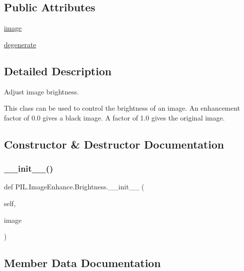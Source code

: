 \subsection*{Public Attributes}
\begin{DoxyCompactItemize}
\item 
\hyperlink{classPIL_1_1ImageEnhance_1_1Brightness_a23f1bdddf742e3eba6c540b351372340}{image}
\item 
\hyperlink{classPIL_1_1ImageEnhance_1_1Brightness_a91d86f1455b0419f8373255adbe1b0be}{degenerate}
\end{DoxyCompactItemize}


\subsection{Detailed Description}
\begin{DoxyVerb}Adjust image brightness.

This class can be used to control the brightness of an image.  An
enhancement factor of 0.0 gives a black image. A factor of 1.0 gives the
original image.
\end{DoxyVerb}
 

\subsection{Constructor \& Destructor Documentation}
\mbox{\label{classPIL_1_1ImageEnhance_1_1Brightness_a1dfdde5a038298050c7d76601a60d5d3}} 
\subsubsection{\texorpdfstring{\+\_\+\+\_\+init\+\_\+\+\_\+()}{\_\_init\_\_()}}
{\footnotesize\ttfamily def P\+I\+L.\+Image\+Enhance.\+Brightness.\+\_\+\+\_\+init\+\_\+\+\_\+ (\begin{DoxyParamCaption}\item[{}]{self,  }\item[{}]{image }\end{DoxyParamCaption})}



\subsection{Member Data Documentation}
\mbox{\label{classPIL_1_1ImageEnhance_1_1Brightness_a91d86f1455b0419f8373255adbe1b0be}} 
